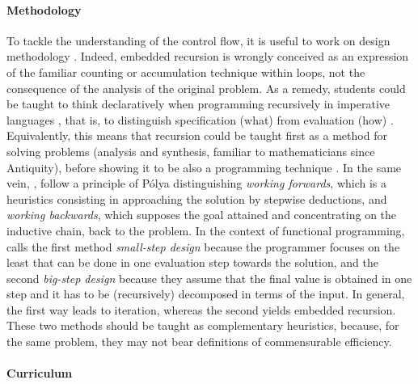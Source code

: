 \documentclass[11pt,a4paper]{article}
\begin{document}
\paragraph{Methodology}
\label{methodology}

To tackle the understanding of the control flow, it is useful to work
on design methodology \citep{KesslerAnderson:1986}. Indeed, embedded
recursion is wrongly conceived as an expression of the familiar
counting or accumulation technique within loops, not the consequence
of the analysis of the original problem. As a remedy, students could
be taught to think declaratively when programming recursively in
imperative languages \citep{Giveon:1989,GinatShifroni:1999}, that is,
to distinguish specification (what) from evaluation (how)
\citep{Ford:1984}. Equivalently, this means that recursion could be
taught first as a method for solving problems (analysis and synthesis,
familiar to mathematicians since Antiquity), before showing it to be
also a programming technique
\citep{McKavanagh:1992,McKavanagh:2004}. In the same vein,
\textcite{Ginat:2005}, \textcite{GinatArmoni:2006} follow a principle
of P\'olya distinguishing \emph{working forwards}, which is a
heuristics consisting in approaching the solution by stepwise
deductions, and \emph{working backwards}, which supposes the goal
attained and concentrating on the inductive chain, back to the
problem. In the context of functional programming,
\textcite{Rinderknecht:2012} calls the first method
\emph{small\hyp{}step design} because the programmer focuses on the
least that can be done in one evaluation step towards the solution,
and the second \emph{big\hyp{}step design} because they assume that
the final value is obtained in one step and it has to be (recursively)
decomposed in terms of the input. In general, the first way leads to
iteration, whereas the second yields embedded recursion. These two
methods should be taught as complementary heuristics, because, for the
same problem, they may not bear definitions of commensurable
efficiency.

\paragraph{Curriculum}
\label{curriculum}
\end{document}
